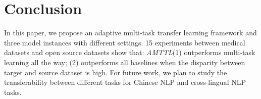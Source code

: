 \section{Conclusion}

In this paper, we propose an adaptive multi-task transfer learning framework and three model instances with different settings. 15 experiments between medical datasets and open source datasets show that: \textit{AMTTL}(1) outperforms multi-task learning all the way; (2) outperforms all baselines when the disparity between target and source dataset is high. For future work, we plan to study the transferability between different tasks for Chinese NLP and cross-lingual NLP tasks.
